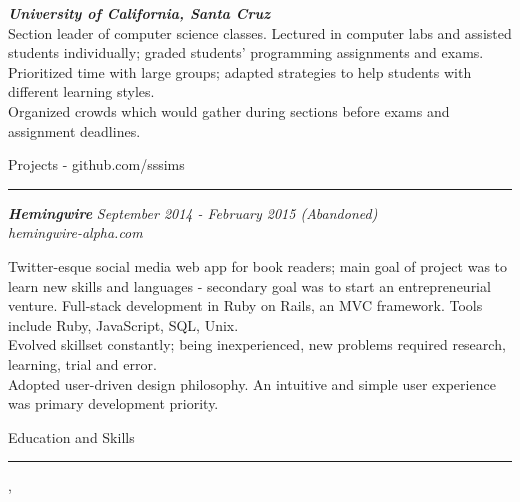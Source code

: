 \documentclass[10pt]{article}
\newcommand{\simsbullet}{{\raisebox{2pt}{\tiny $\bullet$}}\hspace{8pt}}
\begin{document}
\setlength{\leftskip}{0pt}

\vskip 12pt

{\bfseries\itshape\sffamily University of California, Santa Cruz} \hfill {\itshape{}} \\
{\itshape{}}
\vskip 4pt
\setlength{\leftskip}{16pt}
Section leader of computer science classes. Lectured in computer labs and assisted students individually; graded students' programming assignments and exams. 
\vskip 4pt
\simsbullet Prioritized time with large groups; adapted strategies to help students with different learning styles. \\
\simsbullet Organized crowds which would gather during sections before exams and assignment deadlines. 

\setlength{\leftskip}{0pt}

\vskip 14pt


{\Large\sffamily Projects {\small - github.com/sssims}}
\vskip 1pt
\hrule
\vskip 6pt
{\bfseries\itshape\sffamily Hemingwire} \hfill \textsf{\textit{September 2014 - February 2015 (Abandoned)}}\\
\textit{\textsf{hemingwire-alpha.com}} 

\setlength{\leftskip}{16pt}

Twitter-esque social media web app for book readers; main goal of project was to learn new skills and languages - secondary goal was to start an entrepreneurial venture. 
\vskip 4pt
\simsbullet Full-stack development in Ruby on Rails, an MVC framework. Tools include Ruby, JavaScript, SQL, Unix.\\
\simsbullet Evolved skillset constantly; being inexperienced, new problems required research, learning, trial and error.\\
\simsbullet Adopted user-driven design philosophy. An intuitive and simple user experience was primary development priority.

\setlength{\leftskip}{0pt}

\vskip 16pt

{\Large\sffamily Education and Skills}
\vskip 4pt
\hrule
\vskip 6pt
{}
\vskip 2pt
\hspace*{12pt} {\itshape{}}, {} \\
\hspace*{12pt} {\itshape{}}
\end{document}
